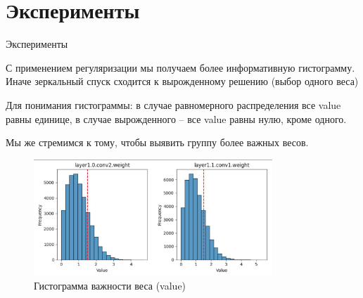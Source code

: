 \documentclass[10pt,pdf,hyperref={unicode}]{beamer}
\begin{document}
\section{Эксперименты}
\begin{frame}{Эксперименты}
\justifying

С применением регуляризации мы получаем более информативную гистограмму. Иначе зеркальный спуск сходится к вырожденному решению (выбор одного веса)

Для понимания гистограммы: в случае равномерного распределения все value равны единице, в случае вырожденного -- все value равны нулю, кроме одного.

Мы же стремимся к тому, чтобы выявить группу более важных весов.

\begin{figure}[h]
\centering
\includegraphics[width=0.8\textwidth]{../figures/impacts.jpeg}
\caption{Гистограмма важности веса (value)}
\end{figure}

\end{frame}

\end{document}
